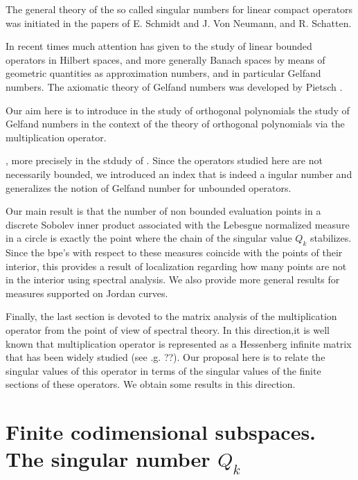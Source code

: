 \documentclass[12pt]{amsart}
\theoremstyle{definition}
\theoremstyle{plain}
\theoremstyle{remark}
\begin{document}
\medskip 

\noindent 
\noindent The general theory of the so called 
singular numbers for linear compact operators was initiated in the papers of E. Schmidt and J. Von Neumann, and R. Schatten. 

\noindent In recent times much attention has given to the study of linear bounded operators in Hilbert spaces, and more generally Banach spaces by means of geometric quantities as approximation numbers, and in particular Gelfand numbers. The axiomatic theory of Gelfand numbers was developed 
 by Pietsch \cite{Pietsh}. 
 
 \noindent Our aim here is to introduce in the study of orthogonal polynomials the study of Gelfand numbers in the context of the theory of orthogonal polynomials via the multiplication operator. 

 
 , more precisely in the stdudy of . Since the operators studied here are not necessarily bounded, we introduced an index that is indeed a ingular number and generalizes the notion of Gelfand number for unbounded operators.  

\noindent Our main  result is that the number of non bounded evaluation points in a discrete Sobolev inner product associated with the Lebesgue normalized measure in a circle is exactly the point where the chain of the singular value $Q_k$ stabilizes. Since the bpe's with respect to these measures coincide with the points of  their interior, this provides a result of localization regarding how many points are not in the interior using spectral analysis. We also provide more general results for measures supported on Jordan curves.  

\noindent Finally, the last section is devoted to the matrix analysis of the multiplication operator from the point of view of spectral theory. In this direction,it is well known that multiplication operator is represented as a Hessenberg infinite matrix that has been widely studied (see .g. ??). Our proposal here is to relate  the singular values of this operator in terms of the singular values of the finite sections of these operators. We obtain some results in this direction.  
 





\section{Finite codimensional subspaces. The singular number   $Q_k$}
\end{document}
